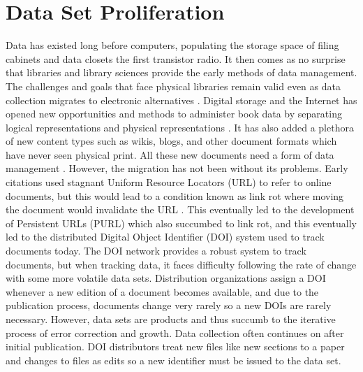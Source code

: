 \section{Data Set Proliferation}

Data has existed long before computers, populating the storage space of filing cabinets and data closets the first transistor radio.
It then comes as no surprise that libraries and library sciences provide the early methods of data management.
The challenges and goals that face physical libraries remain valid even as data collection migrates to electronic alternatives \cite{rohtua}.
Digital storage and the Internet has opened new opportunities and methods to administer book data by separating logical representations and physical representations \cite{Barkstrom_digitallibrary}.
It has also added a plethora of new content types such as wikis, blogs, and other document formats which have never seen physical print.
All these new documents need a form of data management \cite{Berberich:2007:TMT:1277741.1277831}.
However, the migration has not been without its problems.
Early citations used stagnant Uniform Resource Locators (URL) to refer to online documents, but this would lead to a condition known as link rot where moving the document would invalidate the URL \cite{Lyons2005}.
This eventually led to the development of Persistent URLs (PURL) which also succumbed to link rot, and this eventually led to the distributed Digital Object Identifier (DOI) system used to track documents today.
The DOI network provides a robust system to track documents, but when tracking data, it faces difficulty following the rate of change with some more volatile data sets.
Distribution organizations assign a DOI whenever a new edition of a document becomes available, and due to the publication process, documents change very rarely so a new DOIs are rarely necessary.
However, data sets are products and thus succumb to the iterative process of error correction and growth.
Data collection often continues on after initial publication.
DOI distributors treat new files like new sections to a paper and changes to files as edits so a new identifier must be issued to the data set.


